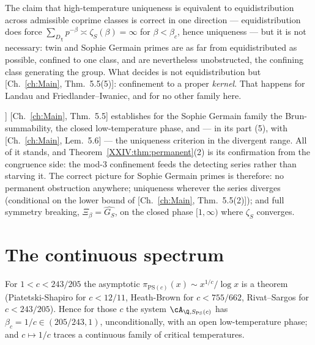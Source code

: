 \begin{corollary}\label{XXIV:cor:criterion}
The claim that high-temperature uniqueness is equivalent to equidistribution across
admissible coprime classes is correct in one direction --- equidistribution does force
$\sum_{D_\chi}p^{-\beta}\asymp\zeta_S(\beta)=\infty$ for $\beta<\beta_c$, hence uniqueness ---
but it is not necessary: twin and Sophie Germain primes are as far from equidistributed as
possible, confined to one class, and are nevertheless unobstructed, the confining class
generating the group. What decides is not equidistribution but
[Ch.~\ref{ch:Main}, Thm.~5.5(5)]: confinement to a proper \emph{kernel}. That happens for Landau
and Friedlander--Iwaniec, and for no other family here.
\end{corollary}

\begin{remark}[Consequence for [Ch.~\ref{ch:Main}]]\label{XXIV:rem:consequence}
[Ch.~\ref{ch:Main}, Thm.~5.5] establishes for the Sophie Germain family the Brun-summability, the
closed low-temperature phase, and --- in its part (5), with [Ch.~\ref{ch:Main}, Lem.~5.6] --- the
uniqueness criterion in the divergent range. All of it stands, and
Theorem~\ref{XXIV:thm:permanent}(2) is its confirmation from the congruence side: the mod-$3$
confinement feeds the detecting series rather than starving it. The correct picture for
Sophie Germain primes is therefore: no permanent obstruction anywhere; uniqueness wherever
the series diverges (conditional on the lower bound of [Ch.~\ref{ch:Main}, Thm.~5.5(2)]); and full
symmetry breaking, $\Xi_\beta=\widehat{G_S}$, on the closed phase $[1,\infty)$ where
$\zeta_S$ converges.
\end{remark}

\section{The continuous spectrum}

\begin{theorem}\label{XXIV:thm:PS}
For $1<c<243/205$ the asymptotic $\pi_{\mathrm{PS}(c)}(x)\sim x^{1/c}/\log x$ is a theorem
(Piatetski-Shapiro for $c<12/11$, Heath-Brown for $c<755/662$, Rivat--Sargos for
$c<243/205$). Hence for those $c$ the system $\cA_{\Q,S_{\mathrm{PS}}(c)}$ has
$\beta_c=1/c\in(205/243,1)$, unconditionally, with an open low-temperature phase; and
$c\mapsto1/c$ traces a continuous family of critical temperatures.
\end{theorem}

